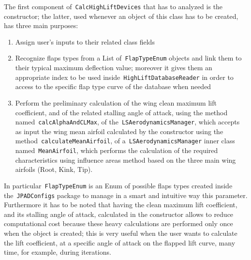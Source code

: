 \bigskip
\noindent
The first component of~\lstinline[language=Java]!CalcHighLiftDevices! that has to analyzed is the constructor; the latter, used whenever an object of this class has to be created, has three main purposes:
%
\begin{enumerate}
\item Assign user's inputs to their related class fields
\item Recognize flaps types from a \gls{List} of~\lstinline[language=Java]!FlapTypeEnum! objects and link them to their typical maximum deflection value; moreover it gives them an appropriate index to be used inside~\lstinline[language=Java]!HighLiftDatabaseReader! in order to access to the specific flap type curve of the database when needed
\item Perform the preliminary calculation of the wing clean maximum lift coefficient, and of the related stalling angle of attack, using the method named~\lstinline[language=Java]!calcAlphaAndCLMax!, of the~\lstinline[language=Java]!LSAerodynamicsManager!, which accepts as input the wing mean airfoil calculated by the constructor using the method~\lstinline[language=Java]!calculateMeanAirfoil!, of a~\lstinline[language=Java]!LSAerodynamicsManager! inner class named~\lstinline[language=Java]!MeanAirfoil!, which performs the calculation of the required characteristics using influence areas method based on the three main wing airfoils (Root, Kink, Tip).   
\end{enumerate}
%
\noindent
In particular~\lstinline[language=Java]!FlapTypeEnum! is an \gls{Enum}\cite{enumAPI} of possible flaps types created inside the~\lstinline[language=Java]!JPADConfigs! package to manage in a smart and intuitive way this parameter. 
%
Furthermore it has to be noted that having the clean maximum lift coefficient, and its stalling angle of attack, calculated in the constructor allows to reduce computational cost because these heavy calculations are performed only once when the object is created; this is very useful when the user wants to calculate the lift coefficient, at a specific angle of attack on the flapped lift curve, many time, for example, during iterations.  
%
\begin{table}[!t]
\caption{Summary of available flaps types with thier related properties}
\label{table:AvailableFlaps}
\end{table}
